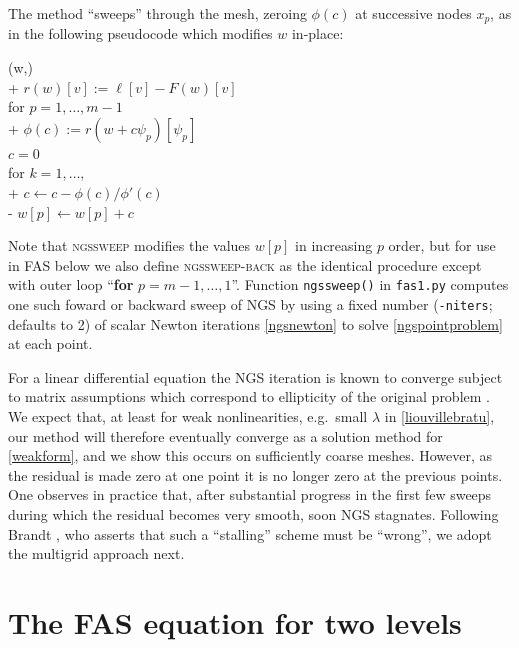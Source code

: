 \documentclass[letterpaper,final,12pt,reqno]{amsart}
\begin{document}
The method ``sweeps'' through the mesh, zeroing $\phi(c)$ at successive nodes $x_p$, as in the following pseudocode which modifies $w$ in-place:

\begin{pseudo*}
(w,\ell)\text{:} \\+
    $r(w)[v] := \ell[v] - F(w)[v]$ \\
    for $p=1,\dots,m-1$ \\+
        $\phi(c) := r(w + c \psi_p)[\psi_p]$ \\
        $c=0$ \\
        for $k=1,\dots,$ \\+
            $c \gets c - \phi(c) / \phi'(c)$ \\-
        $w[p] \gets w[p] + c$
\end{pseudo*}

Note that \textsc{ngssweep} modifies the values $w[p]$ in increasing $p$ order, but for use in FAS below we also define \textsc{ngssweep-back} as the identical procedure except with outer loop ``\textbf{for} $p=m-1,\dots,1$''.  Function \texttt{ngssweep()} in \texttt{fas1.py} computes one such foward or backward sweep of NGS by using a fixed number (\texttt{-niters}; defaults to 2) of scalar Newton iterations \eqref{ngsnewton} to solve \eqref{ngspointproblem} at each point.

For a linear differential equation the NGS iteration is known to converge subject to matrix assumptions which correspond to ellipticity of the original problem \cite[for example]{Greenbaum1997}.  We expect that, at least for weak nonlinearities, e.g.~small $\lambda$ in \eqref{liouvillebratu}, our method will therefore eventually converge as a solution method for \eqref{weakform}, and we show this occurs on sufficiently coarse meshes.  However, as the residual is made zero at one point it is no longer zero at the previous points.  One observes in practice that, after substantial progress in the first few sweeps during which the residual becomes very smooth, soon NGS stagnates.  Following Brandt \cite{Brandt1977,BrandtLivne2011}, who asserts that such a ``stalling'' scheme must be ``wrong'', we adopt the multigrid approach next.


\section{The FAS equation for two levels}  \label{sec:fastwolevel}
\end{document}
